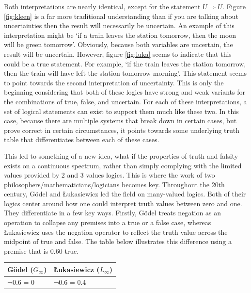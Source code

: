 \documentclass{article}
\begin{document}
Both interpretations are nearly identical, except for the statement $U\Rightarrow U$. Figure \ref{fig:kleen} is a far more traditional understanding than if you are talking about uncertainties then the result will necessarily be uncertain. An example of this interpretation might be ‘if a train leaves the station tomorrow, then the moon will be green tomorrow’. Obviously, because both variables are uncertain, the result will be uncertain. However, figure \ref{fig:luka} seems to indicate that this could be a true statement. For example, ‘if the train leaves the station tomorrow, then the train will have left the station tomorrow morning’. This statement seems to point towards the second interpretation of uncertainty. This is only the beginning considering that both of these logics have strong and weak variants for the combinations of true, false, and uncertain. For each of these interpretations, a set of logical statements can exist to support them much like these two. In this case, because there are multiple systems that break down in certain cases, but prove correct in certain circumstances, it points towards some underlying truth table that differentiates between each of these cases.

This led to something of a new idea, what if the properties of truth and falsity exists on a continuous spectrum, rather than simply complying with the limited values provided by 2 and 3 values logics. This is where the work of two philosophers/mathematicians/logicians becomes key. Throughout the 20th century, Gödel and Łukasiewicz led the field on many-valued logics. Both of their logics center around how one could interpret truth values between zero and one. They differentiate in a few key ways. Firstly, Gödel treats negation as an operation to collapse any premises into a true or a false case, whereas Łukasiewicz uses the negation operator to reflect the truth value across the midpoint of true and false. The table below illustrates this difference using a premise that is 0.60 true. 

\begin{center}
\begin{tabularx}{0.8\textwidth} { 
  | >{\centering\arraybackslash}X 
  | >{\centering\arraybackslash}X  | }
 \hline
 Gödel ($G_\infty$) &  Łukasiewicz ($L_\infty$) \\
 \hline
 ¬0.6 = 0  & ¬0.6 = 0.4  \\
\hline
\end{tabularx}
\end{center}
\end{document}
